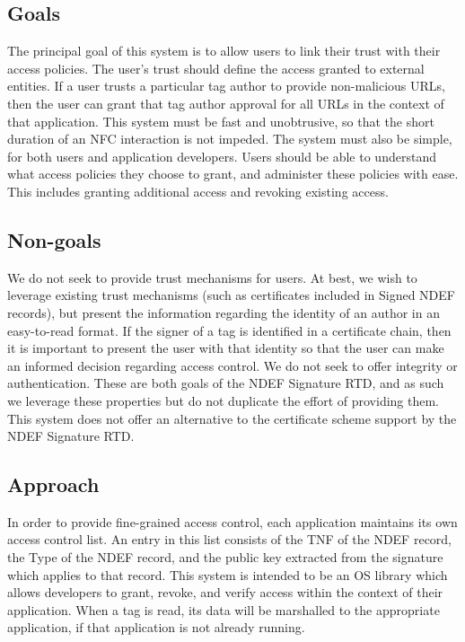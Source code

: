 \documentclass[12pt]{article}
\begin{document}
\subsection{Goals}
The principal goal of this system is to allow users to link their trust with their access policies.
The user's trust should define the access granted to external entities.
If a user trusts a particular tag author to provide non-malicious URLs, then the user can grant that tag author approval for all URLs in the context of that application.
This system must be fast and unobtrusive, so that the short duration of an NFC interaction is not impeded.
The system must also be simple, for both users and application developers.
Users should be able to understand what access policies they choose to grant, and administer these policies with ease.
This includes granting additional access and revoking existing access.
\subsection{Non-goals}
We do not seek to provide trust mechanisms for users.
At best, we wish to leverage existing trust mechanisms (such as certificates included in Signed NDEF records), but present the information regarding the identity of an author in an easy-to-read format.
If the signer of a tag is identified in a certificate chain, then it is important to present the user with that identity so that the user can make an informed decision regarding access control.
We do not seek to offer integrity or authentication.
These are both goals of the NDEF Signature RTD, and as such we leverage these properties but do not duplicate the effort of providing them.
This system does not offer an alternative to the certificate scheme support by the NDEF Signature RTD.
\subsection{Approach}
In order to provide fine-grained access control, each application maintains its own access control list.
An entry in this list consists of the TNF of the NDEF record, the Type of the NDEF record, and the public key extracted from the signature which applies to that record.
This system is intended to be an OS library which allows developers to grant, revoke, and verify access within the context of their application.
When a tag is read, its data will be marshalled to the appropriate application, if that application is not already running.
\end{document}

